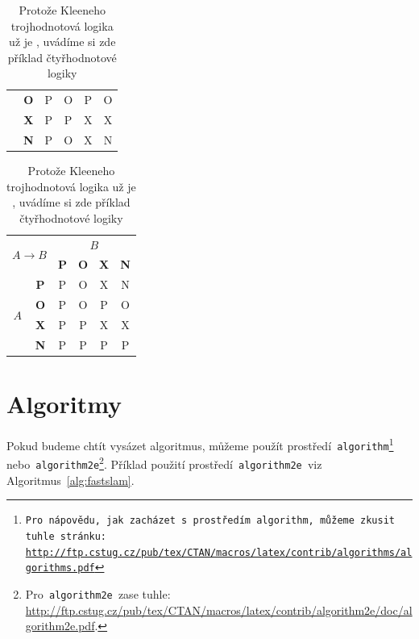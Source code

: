 \documentclass[11pt]{article}
\begin{document}
\begin{table}[h]
\begin{tabular}{|c|c|c|c|c|c|}
                                                          & \textbf{O}               & P          & O          & P          & O \\
        \cline{2-6}
                                                          & \textbf{X}               & P          & P          & X          & X \\
        \cline{2-6}
                                                          & \textbf{N}               & P          & O          & X          & N \\
        \hline
    \end{tabular}
    \begin{tabular}{|c|c|c|c|c|c|}
        \hline
        \multicolumn{2}{|c|}{\multirow{2}{*}{$A \rightarrow B$}} & \multicolumn{4}{c|}{$B$}                                            \\
        \cline{3-6}
        \multicolumn{2}{|c|}{}                                   & \textbf{P}               & \textbf{O} & \textbf{X} & \textbf{N}     \\
        \hline
        \multirow{4}{*}{$A$}                                     & \textbf{P}               & P          & O          & X          & N \\
        \cline{2-6}
                                                                 & \textbf{O}               & P          & O          & P          & O \\
        \cline{2-6}
                                                                 & \textbf{X}               & P          & P          & X          & X \\
        \cline{2-6}
                                                                 & \textbf{N}               & P          & P          & P          & P \\
        \hline
    \end{tabular}

    \caption{Protože Kleeneho trojhodnotová logika už je , uvádíme si zde příklad čtyřhodnotové logiky}
    \label{tab:logic}
\end{table}
\bigskip
\pagebreak

\section{Algoritmy}
\label{sec:algorithms}
Pokud budeme chtít vysázet algoritmus, můžeme použít prostředí\texttt{ algorithm\footnote{Pro nápovědu, jak zacházet s~prostředím\texttt{ algorithm,} můžeme zkusit tuhle stránku:\\\url{http://ftp.cstug.cz/pub/tex/CTAN/macros/latex/contrib/algorithms/algorithms.pdf} } }
nebo\texttt{ algorithm2e}\footnote{Pro\texttt{ algorithm2e }zase tuhle: \url{http://ftp.cstug.cz/pub/tex/CTAN/macros/latex/contrib/algorithm2e/doc/algorithm2e.pdf}.}.
Příklad použití prostředí\texttt{ algorithm2e }viz Algoritmus~\ref{alg:fastslam}.\\
\end{document}
